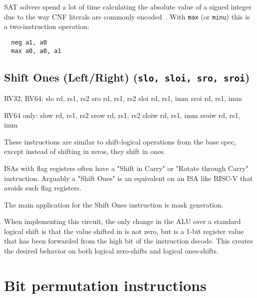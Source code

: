 SAT solvers spend a lot of time calculating the absolute value of a signed
integer due to the way CNF literals are commonly encoded~\cite{BiereComm}. With
\texttt{max} (or \texttt{minu}) this is a two-instruction operation:

\begin{minipage}{\linewidth}
\begin{verbatim}
  neg a1, a0
  max a0, a0, a1
\end{verbatim}
\end{minipage}


\subsection{Shift Ones (Left/Right) (\texttt{slo,\ sloi,\ sro,\ sroi})}

\begin{rvb}
  RV32, RV64:
    slo rd, rs1, rs2
    sro rd, rs1, rs2
    sloi rd, rs1, imm
    sroi rd, rs1, imm

  RV64 only:
    slow rd, rs1, rs2
    srow rd, rs1, rs2
    sloiw rd, rs1, imm
    sroiw rd, rs1, imm
\end{rvb}

These instructions are similar to shift-logical operations from the base
spec, except instead of shifting in zeros, they shift in ones.



ISAs with flag registers often have a "Shift in Carry" or "Rotate through Carry" instruction.
Arguably a "Shift Ones" is an equivalent on an ISA like RISC-V that avoids such flag registers.

The main application for the Shift Ones instruction is mask generation.

When implementing this circuit, the only change in the ALU over a
standard logical shift is that the value shifted in is not zero, but is
a 1-bit register value that has been forwarded from the high bit of the
instruction decode. This creates the desired behavior on both logical
zero-shifts and logical ones-shifts.


\section{Bit permutation instructions}


